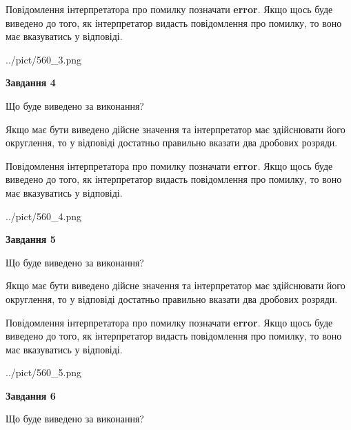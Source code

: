 \documentclass[12pt, ukrainian]{article}
\begin{document}
{\begin {Large}
Повідомлення інтерпретатора про помилку позначати \textbf{error}.
Якщо щось буде виведено до того, як інтерпретатор видасть повідомлення про помилку, 
то воно має вказуватись у відповіді. \par

\begin{center}
	{../pict/560_3.png}
\end{center}
\newpage

{\begin {center}\textbf{Завдання 4}\end {center}}\par
Що буде виведено за виконання? \par

Якщо має бути виведено дійсне значення та інтерпретатор має здійснювати його округлення, 
то у відповіді достатньо правильно вказати два дробових розряди.

Повідомлення інтерпретатора про помилку позначати \textbf{error}.
Якщо щось буде виведено до того, як інтерпретатор видасть повідомлення про помилку, 
то воно має вказуватись у відповіді. \par

\begin{center}
	{../pict/560_4.png}
\end{center}
\newpage

{\begin {center}\textbf{Завдання 5}\end {center}}\par
Що буде виведено за виконання? \par

Якщо має бути виведено дійсне значення та інтерпретатор має здійснювати його округлення, 
то у відповіді достатньо правильно вказати два дробових розряди.

Повідомлення інтерпретатора про помилку позначати \textbf{error}.
Якщо щось буде виведено до того, як інтерпретатор видасть повідомлення про помилку, 
то воно має вказуватись у відповіді. \par

\begin{center}
	{../pict/560_5.png}
\end{center}
\newpage

{\begin {center}\textbf{Завдання 6}\end {center}}\par
Що буде виведено за виконання? \par


\end{Large}}
\end{document}
